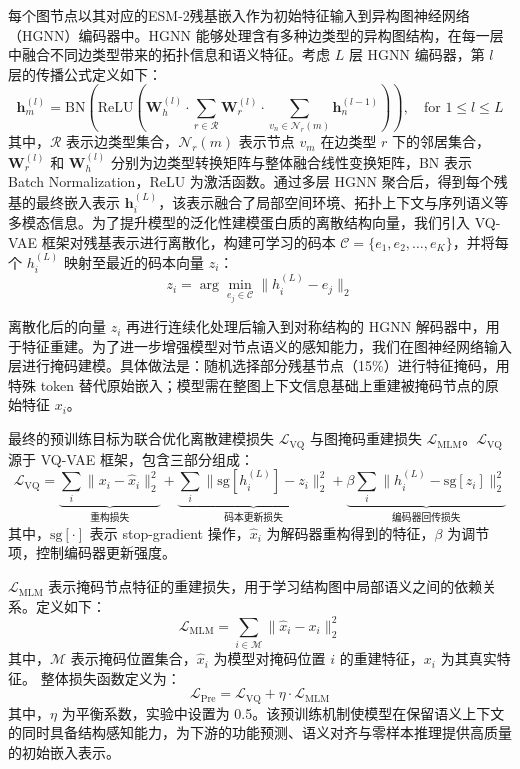 每个图节点以其对应的ESM-2残基嵌入作为初始特征输入到异构图神经网络（HGNN）编码器中。HGNN 能够处理含有多种边类型的异构图结构，在每一层中融合不同边类型带来的拓扑信息和语义特征。考虑 $L$ 层 HGNN 编码器，第 $l$ 层的传播公式定义如下：
\begin{equation}
\mathbf{h}_m^{(l)} = \text{BN}\left( 
\text{ReLU} \left( 
\mathbf{W}_h^{(l)} \cdot \sum_{r \in \mathcal{R}} \mathbf{W}_r^{(l)} \cdot \sum_{v_n \in \mathcal{N}_r(m)} \mathbf{h}_n^{(l-1)} 
\right) 
\right), \quad \text{for } 1 \leq l \leq L
\end{equation}
其中，$\mathcal{R}$ 表示边类型集合，$\mathcal{N}_r(m)$ 表示节点 $v_m$ 在边类型 $r$ 下的邻居集合，$\mathbf{W}_r^{(l)}$ 和 $\mathbf{W}_h^{(l)}$ 分别为边类型转换矩阵与整体融合线性变换矩阵，BN 表示 Batch Normalization，ReLU 为激活函数。通过多层 HGNN 聚合后，得到每个残基的最终嵌入表示 $\mathbf{h}_i^{(L)}$，该表示融合了局部空间环境、拓扑上下文与序列语义等多模态信息。为了提升模型的泛化性建模蛋白质的离散结构向量，我们引入 VQ-VAE \cite{yan2021videogpt}框架对残基表示进行离散化，构建可学习的码本 $\mathcal{C} = \{e_1, e_2, \ldots, e_K\}$，并将每个 $h_i^{(L)}$ 映射至最近的码本向量 $z_i$：
\begin{equation}
z_i = \arg\min_{e_j \in \mathcal{C}} \| h_i^{(L)} - e_j \|_2
\end{equation}

离散化后的向量 $z_i$ 再进行连续化处理后输入到对称结构的 HGNN 解码器中，用于特征重建。为了进一步增强模型对节点语义的感知能力，我们在图神经网络输入层进行掩码建模。具体做法是：随机选择部分残基节点（15\%）进行特征掩码，用特殊 token 替代原始嵌入；模型需在整图上下文信息基础上重建被掩码节点的原始特征 $x_i$。

最终的预训练目标为联合优化离散建模损失 $\mathcal{L}_{\text{VQ}}$ 与图掩码重建损失 $\mathcal{L}_{\text{MLM}}$。$\mathcal{L}_{\text{VQ}}$ 源于 VQ-VAE 框架，包含三部分组成：
\begin{equation}
\mathcal{L}_{\text{VQ}} = 
\underbrace{\sum_i \| x_i - \hat{x}_i \|_2^2}_{\text{重构损失}} + 
\underbrace{\sum_i \| \text{sg}[h_i^{(L)}] - z_i \|_2^2}_{\text{码本更新损失}} + 
\underbrace{\beta \sum_i \| h_i^{(L)} - \text{sg}[z_i] \|_2^2}_{\text{编码器回传损失}}
\end{equation}
其中，$\text{sg}[\cdot]$ 表示 stop-gradient 操作，$\hat{x}_i$ 为解码器重构得到的特征，$\beta$ 为调节项，控制编码器更新强度。

$\mathcal{L}_{\text{MLM}}$ 表示掩码节点特征的重建损失，用于学习结构图中局部语义之间的依赖关系。定义如下：
\begin{equation}
\mathcal{L}_{\text{MLM}} = \sum_{i \in \mathcal{M}} \| \hat{x}_i - x_i \|_2^2
\end{equation}
其中，$\mathcal{M}$ 表示掩码位置集合，$\hat{x}_i$ 为模型对掩码位置 $i$ 的重建特征，$x_i$ 为其真实特征。
整体损失函数定义为：
\begin{equation}
\mathcal{L}_{\text{Pre}} = \mathcal{L}_{\text{VQ}} + \eta \cdot \mathcal{L}_{\text{MLM}}
\end{equation}
其中，$\eta$ 为平衡系数，实验中设置为 0.5。该预训练机制使模型在保留语义上下文的同时具备结构感知能力，为下游的功能预测、语义对齐与零样本推理提供高质量的初始嵌入表示。


